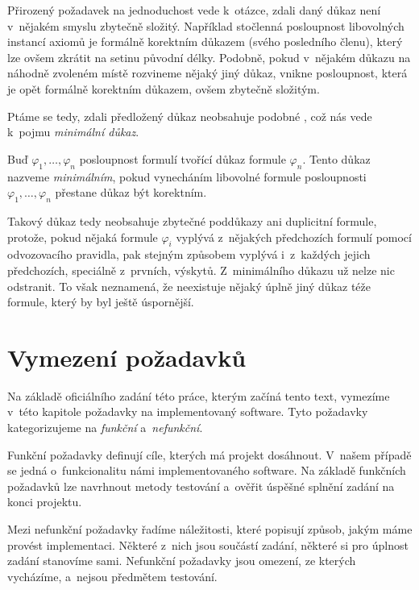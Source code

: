 \documentclass[thesis=B,czech,hidelinks]{thesis}[2012/06/26]
\begin{document}
Přirozený požadavek na jednoduchost vede k~otázce, zdali daný důkaz není v~nějakém smyslu zbytečně složitý. Například stočlenná posloupnost libovolných instancí axiomů je formálně korektním důkazem (svého posledního členu), který lze ovšem zkrátit na setinu původní délky. Podobně, pokud v~nějakém důkazu na náhodně zvoleném místě rozvineme nějaký jiný důkaz, vnikne posloupnost, která je opět formálně korektním důkazem, ovšem zbytečně složitým.

Ptáme se tedy, zdali předložený důkaz neobsahuje podobné , což nás vede k~pojmu \emph{minimální důkaz}.

\begin{dfn}
\label{dfn:minimal_proof}
Buď $\varphi_1, \ldots, \varphi_n$ posloupnost formulí tvořící důkaz formule $\varphi_n$. Tento důkaz nazveme \emph{minimálním}, pokud vynecháním libovolné formule posloupnosti $\varphi_1, \ldots, \varphi_n$ přestane důkaz být korektním.
\end{dfn}

Takový důkaz tedy neobsahuje zbytečné poddůkazy ani duplicitní formule, protože, pokud nějaká formule $\varphi_i$ vyplývá z~nějakých předchozích formulí pomocí odvozovacího pravidla, pak stejným způsobem vyplývá i~z~každých jejich předchozích, speciálně z~prvních, výskytů. Z~minimálního důkazu už nelze nic odstranit. To však neznamená, že neexistuje nějaký úplně jiný důkaz téže formule, který by byl ještě úspornější.

%
%
%

\chapter{Vymezení požadavků}

Na základě oficiálního zadání této práce, kterým začíná tento text, vymezíme v~této kapitole požadavky na implementovaný software. Tyto požadavky kategorizujeme na \emph{funkční} a~\emph{nefunkční}.

Funkční požadavky definují cíle, kterých má projekt dosáhnout. V~našem případě se jedná o~funkcionalitu námi implementovaného software. Na základě funkčních požadavků lze navrhnout metody testování a~ověřit úspěšné splnění zadání na konci projektu.

Mezi nefunkční požadavky řadíme náležitosti, které popisují způsob, jakým máme provést implementaci. Některé z~nich jsou součástí zadání, některé si pro úplnost zadání stanovíme sami. Nefunkční požadavky jsou omezení, ze kterých vycházíme, a~nejsou předmětem testování.
\end{document}
